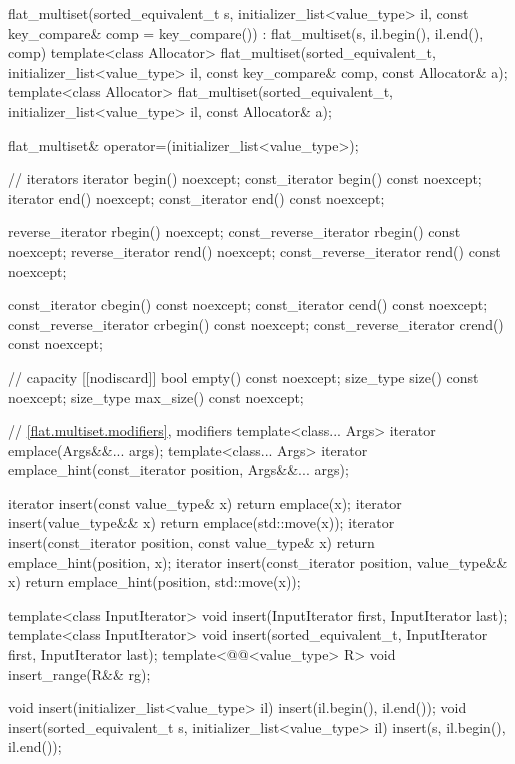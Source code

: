 \begin{codeblock}
{{    flat_multiset(sorted_equivalent_t s, initializer_list<value_type> il,
                  const key_compare& comp = key_compare())
        : flat_multiset(s, il.begin(), il.end(), comp) { }
    template<class Allocator>
      flat_multiset(sorted_equivalent_t, initializer_list<value_type> il,
                    const key_compare& comp, const Allocator& a);
    template<class Allocator>
      flat_multiset(sorted_equivalent_t, initializer_list<value_type> il, const Allocator& a);

    flat_multiset& operator=(initializer_list<value_type>);

    // iterators
    iterator               begin() noexcept;
    const_iterator         begin() const noexcept;
    iterator               end() noexcept;
    const_iterator         end() const noexcept;

    reverse_iterator       rbegin() noexcept;
    const_reverse_iterator rbegin() const noexcept;
    reverse_iterator       rend() noexcept;
    const_reverse_iterator rend() const noexcept;

    const_iterator         cbegin() const noexcept;
    const_iterator         cend() const noexcept;
    const_reverse_iterator crbegin() const noexcept;
    const_reverse_iterator crend() const noexcept;

    // capacity
    [[nodiscard]] bool empty() const noexcept;
    size_type size() const noexcept;
    size_type max_size() const noexcept;

    // \ref{flat.multiset.modifiers}, modifiers
    template<class... Args> iterator emplace(Args&&... args);
    template<class... Args>
      iterator emplace_hint(const_iterator position, Args&&... args);

    iterator insert(const value_type& x)
      { return emplace(x); }
    iterator insert(value_type&& x)
      { return emplace(std::move(x)); }
    iterator insert(const_iterator position, const value_type& x)
      { return emplace_hint(position, x); }
    iterator insert(const_iterator position, value_type&& x)
      { return emplace_hint(position, std::move(x)); }

    template<class InputIterator>
      void insert(InputIterator first, InputIterator last);
    template<class InputIterator>
      void insert(sorted_equivalent_t, InputIterator first, InputIterator last);
    template<@@<value_type> R>
      void insert_range(R&& rg);

    void insert(initializer_list<value_type> il)
      { insert(il.begin(), il.end()); }
    void insert(sorted_equivalent_t s, initializer_list<value_type> il)
      { insert(s, il.begin(), il.end()); }

}}
\end{codeblock}
